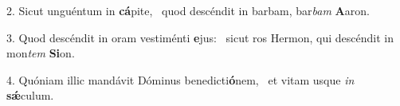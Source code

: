 2. Sicut unguéntum in \textbf{cá}pite, \ast\  quod descéndit in barbam, bar\textit{bam} \textbf{A}aron.\

3. Quod descéndit in oram vestiménti \textbf{e}jus: \ast\  sicut ros Hermon, qui descéndit in mon\textit{tem} \textbf{Si}on.\

4. Quóniam illic mandávit Dóminus benedicti\textbf{ó}nem, \ast\  et vitam usque \textit{in} \textbf{sǽ}culum.\

